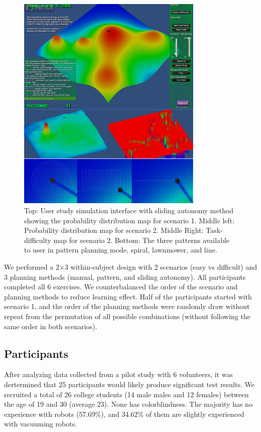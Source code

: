 \documentclass[journal]{IEEEtran}
\begin{document}
\begin{figure}
\centering
\includegraphics[width=3.5in]{UserStudy.JPG}
\caption{Top: User study simulation interface with sliding autonomy method showing the probability distribution map for scenario 1. Middle left: Probability distribution map for scenario 2. Middle Right: Task-difficulty map for scenario 2. Bottom: The three patterns available to user in pattern planning mode, spiral, lawnmower, and line.}
\label{UserStudy}
\end{figure}

We performed a 2$\times$3 within-subject design with 2 scenarios (easy vs difficult) and 3 planning methods (manual, pattern, and sliding autonomy). All participants completed all 6 exercises. We counterbalanced the order of the scenario and planning methods to reduce learning effect. Half of the participants started with scenario 1, and the order of the planning methods were randomly draw without repeat from the permutation of all possible combinations (without following the same order in both scenarios).

\subsection{Participants}

After analyzing data collected from a pilot study with 6 volunteers, it was dertermined that 25 participants would likely produce significant test results. We recruited a total of 26 college students (14 male males and 12 females) between the age of 19 and 30 (average 23). None has colorblindness. The majority has no experience with robots (57.69\%), and 34.62\% of them are slightly experienced with vacuuming robots.
\end{document}
